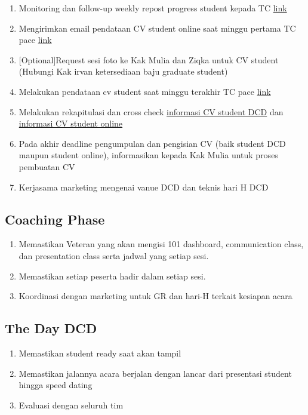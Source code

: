 \documentclass[
]{book}
\providecommand{\tightlist}{%
  \setlength{\itemsep}{0pt}\setlength{\parskip}{0pt}}
\begin{document}
\begin{enumerate}
\def\labelenumi{\arabic{enumi}.}
\tightlist
\item
  Monitoring dan follow-up weekly repost progress student kepada TC \href{https://docs.google.com/spreadsheets/d/1kDS77uA1uYJJyS_Oatv_WJTKEOiYXZgkUyEF3CEXo-M/edit\#gid=223180597}{link}
\item
  Mengirimkan email pendataan CV student online saat minggu pertama TC pace \href{bit.ly/student-cv-online}{link}
\item
  {[}Optional{]}Request sesi foto ke Kak Mulia dan Ziqka untuk CV student (Hubungi Kak irvan ketersediaan baju graduate student)
\item
  Melakukan pendataan cv student saat minggu terakhir TC pace \href{bit.ly/student-cv-dcd9}{link}
\item
  Melakukan rekapitulasi dan cross check \href{bit.ly/algo-student-dcd-cv}{informasi CV student DCD} dan \href{bit.ly/algo-student-online-cv}{informasi CV student online}
\item
  Pada akhir deadline pengumpulan dan pengisian CV (baik student DCD maupun student online), informasikan kepada Kak Mulia untuk proses pembuatan CV
\item
  Kerjasama marketing mengenai vanue DCD dan teknis hari H DCD
\end{enumerate}

\hypertarget{coaching-phase}{%
\subsection{Coaching Phase}\label{coaching-phase}}

\begin{enumerate}
\def\labelenumi{\arabic{enumi}.}
\tightlist
\item
  Memastikan Veteran yang akan mengisi 101 dashboard, communication class, dan presentation class serta jadwal yang setiap sesi.
\item
  Memastikan setiap peserta hadir dalam setiap sesi.
\item
  Koordinasi dengan marketing untuk GR dan hari-H terkait kesiapan acara
\end{enumerate}

\hypertarget{the-day-dcd}{%
\subsection{The Day DCD}\label{the-day-dcd}}

\begin{enumerate}
\def\labelenumi{\arabic{enumi}.}
\tightlist
\item
  Memastikan student ready saat akan tampil
\item
  Memastikan jalannya acara berjalan dengan lancar dari presentasi student hingga speed dating
\item
  Evaluasi dengan seluruh tim
\end{enumerate}
\end{document}
